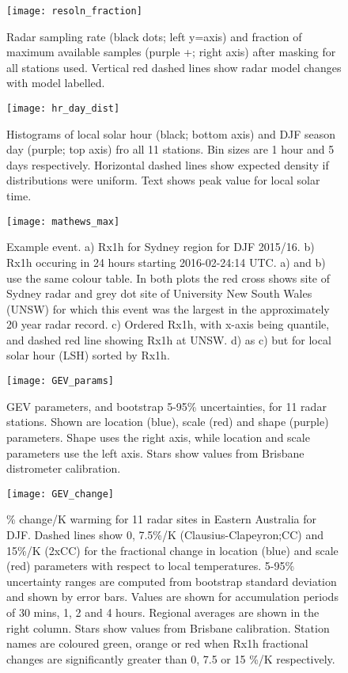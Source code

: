 \documentclass{ametsocV5}
\begin{document}
\begin{figure}
    \centering
    \texttt{[image: resoln\_fraction]}
    \caption{Radar sampling rate (black dots; left y=axis) and fraction of maximum available samples (purple +; right axis) after masking for all stations used. Vertical red dashed lines show radar model changes with model labelled. }
    \label{fig:resoln_fraction}
\end{figure}

\begin{figure}
    \centering
    \texttt{[image: hr\_day\_dist]}
    \caption{Histograms of local solar hour (black; bottom axis) and DJF season day (purple; top axis) fro all 11 stations. Bin sizes are 1 hour and 5 days respectively. Horizontal dashed lines show expected density if distributions were uniform.  Text shows peak value for local solar time. }
    \label{fig:hr_day_dist}
\end{figure}

\begin{figure}
    \centering
    \texttt{[image: mathews\_max]}
    \caption{Example event. a)  Rx1h for Sydney region for DJF 2015/16. b) Rx1h occuring in  24 hours starting 2016-02-24:14 UTC. a) and b) use the same colour table. In both plots the  red cross shows site of Sydney radar and grey dot site of University New South Wales (UNSW) for which this event was the largest in the approximately 20 year radar record. c) Ordered Rx1h, with x-axis being quantile, and dashed red line showing Rx1h at UNSW. d)  as c) but for local solar hour (LSH) sorted by  Rx1h.   }
    \label{fig:Mathews_max}
\end{figure}

\begin{figure}[h]
 \centerline{\texttt{[image: GEV\_params]}}
  \caption{GEV parameters, and bootstrap 5-95\% uncertainties, for 11 radar stations. Shown are location (blue), scale (red) and shape (purple) parameters. Shape uses the right axis, while location and scale parameters use the left axis. Stars show values from Brisbane distrometer calibration.}
  \label{fig:return_values}
\end{figure}


\begin{figure}[h]
 \centerline{\texttt{[image: GEV\_change]}}
  \caption{\% change/K warming for 11 radar sites in Eastern Australia for DJF. Dashed lines show 0, 7.5\%/K (Clausius-Clapeyron;CC) and 15\%/K (2xCC) for the  fractional change in location (blue) and scale (red) parameters with respect to  local temperatures. 5-95\% uncertainty ranges are computed from bootstrap standard deviation and shown by error bars. Values are shown for accumulation periods of 30 mins, 1, 2 and 4 hours. Regional averages are shown in the right column. Stars show values from Brisbane calibration. Station names are coloured green, orange or red when Rx1h fractional changes are significantly greater than 0, 7.5 or 15 \%/K respectively.}
  \label{fig:gev_change}
\end{figure}
\end{document}
